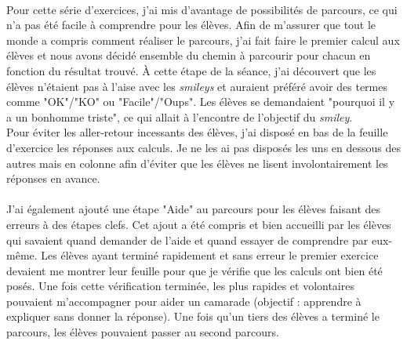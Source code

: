 \paragraph{}Pour cette série d'exercices, j'ai mis d'avantage de possibilités de parcours, ce qui n'a pas été facile à comprendre pour les élèves. Afin de m'assurer que tout le monde a compris comment réaliser le parcours, j'ai fait faire le premier calcul aux élèves et nous avons décidé ensemble du chemin à parcourir pour chacun en fonction du résultat trouvé. À cette étape de la séance, j'ai découvert que les élèves n'étaient pas à l'aise avec les \textit{smileys} et auraient préféré avoir des termes comme "OK"/"KO" ou "Facile"/"Oups". Les élèves se demandaient "pourquoi il y a un bonhomme triste", ce qui allait à l'encontre de l'objectif du \textit{smiley}.\\
Pour éviter les aller-retour incessants des élèves, j'ai disposé en bas de la feuille d'exercice les réponses aux calculs. Je ne les ai pas disposés les uns en dessous des autres mais en colonne afin d'éviter que les élèves ne lisent involontairement les réponses en avance.
\paragraph{}J'ai également ajouté une étape "Aide" au parcours pour les élèves faisant des erreurs à des étapes clefs. Cet ajout a été compris et bien accueilli par les élèves qui savaient quand demander de l'aide et quand essayer de comprendre par eux-même. Les élèves ayant terminé rapidement et sans erreur le premier exercice devaient me montrer leur feuille pour que je vérifie que les calculs ont bien été posés. Une fois cette vérification terminée, les plus rapides et volontaires pouvaient m'accompagner pour aider un camarade (objectif : apprendre à expliquer sans donner la réponse). Une fois qu'un tiers des élèves a terminé le parcours, les élèves pouvaient passer au second parcours.
